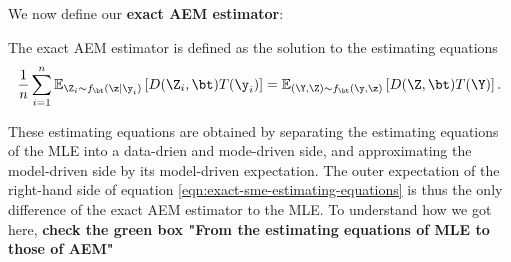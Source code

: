We now define our \textbf{exact AEM estimator}:

\begin{tcolorbox}[colback=blue!3!white,colframe=blue!70!black,title=The Exact AEM Estimator]
The exact AEM estimator is defined as the solution to the estimating equations
\begin{equation}
\frac{1}{n} \sum_{i=1}^{n} 
\mathbb{E}_{\Z_i \sim f_\bt(\z \mid \y_i)} \left[
    D(\Z_i, \bt)
    T(\y_i)
\right]
=
\mathbb{E}_{(\Y, \Z) \sim f_\bt(\y, \z)} \left[
    D(\Z, \bt)
    T(\Y)
\right].
\label{eqn:exact-sme-estimating-equations}
\end{equation}

These estimating equations are obtained by separating the estimating equations of the MLE into a data-drien and mode-driven side, and approximating the model-driven side by its model-driven expectation. The outer expectation of the right-hand side of equation \eqref{eqn:exact-sme-estimating-equations} is thus the only difference of the exact AEM estimator to the MLE. To understand how we got here, \textbf{check the green box "From the estimating equations of MLE to those of AEM"}
\end{tcolorbox}

